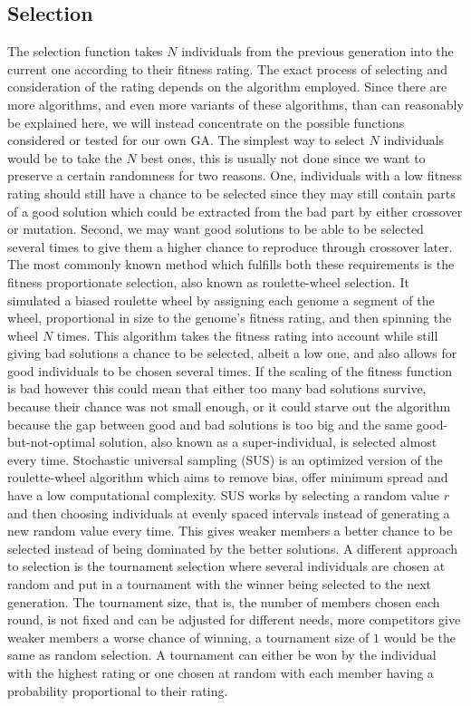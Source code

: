 \subsection{Selection}
\label{sec:selection}

The selection function takes $N$ individuals from the previous generation into the current one according to their fitness rating. The exact process of selecting and consideration of the rating depends on the algorithm employed. Since there are more algorithms, and even more variants of these algorithms, than can reasonably be explained here, we will instead concentrate on the possible functions considered or tested for our own GA. The simplest way to select $N$ individuals would be to take the $N$ best ones, this is usually not done since we want to preserve a certain randomness for two reasons. One, individuals with a low fitness rating should still have a chance to be selected since they may still contain parts of a good solution which could be extracted from the bad part by either crossover or mutation. Second, we may want good solutions to be able to be selected several times to give them a higher chance to reproduce through crossover later. The most commonly known method which fulfills both these requirements is the fitness proportionate selection\cite{16}, also known as roulette-wheel selection. It simulated a biased roulette wheel by assigning each genome a segment of the wheel, proportional in size to the genome's fitness rating, and then spinning the wheel $N$ times. This algorithm takes the fitness rating into account while still giving bad solutions a chance to be selected, albeit a low one, and also allows for good individuals to be chosen several times.  If the scaling of the fitness function is bad however this could mean that either too many bad solutions survive, because their chance was not small enough, or it could starve out the algorithm because the gap between good and bad solutions is too big and the same good-but-not-optimal solution, also known as a super-individual, is selected almost every time. Stochastic universal sampling (SUS) is an optimized version \cite{16} of the roulette-wheel algorithm which aims to remove bias, offer minimum spread and have a low computational complexity. SUS works by selecting a random value $r$ and then choosing individuals at evenly spaced intervals instead of generating a new random value every time. This gives weaker members a better chance to be selected instead of being dominated by the better solutions.\cite{17} A different approach to selection is the tournament selection where several individuals are chosen at random and put in a tournament with the winner being selected to the next generation. The tournament size, that is, the number of members chosen each round, is not fixed and can be adjusted for different needs, more competitors give weaker members a worse chance of winning, a tournament size of $1$ would be the same as random selection. A tournament can either be won by the individual with the highest rating or one chosen at random with each member having a probability proportional to their rating.

